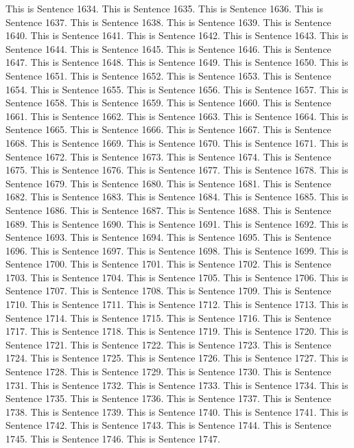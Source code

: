 \documentclass{article}
\begin{document}
This is Sentence 1634.
This is Sentence 1635.
This is Sentence 1636.
This is Sentence 1637.
This is Sentence 1638.
This is Sentence 1639.
This is Sentence 1640.
This is Sentence 1641.
This is Sentence 1642.
This is Sentence 1643.
This is Sentence 1644.
This is Sentence 1645.
This is Sentence 1646.
This is Sentence 1647.
This is Sentence 1648.
This is Sentence 1649.
This is Sentence 1650.
This is Sentence 1651.
This is Sentence 1652.
This is Sentence 1653.
This is Sentence 1654.
This is Sentence 1655.
This is Sentence 1656.
This is Sentence 1657.
This is Sentence 1658.
This is Sentence 1659.
This is Sentence 1660.
This is Sentence 1661.
This is Sentence 1662.
This is Sentence 1663.
This is Sentence 1664.
This is Sentence 1665.
This is Sentence 1666.
This is Sentence 1667.
This is Sentence 1668.
This is Sentence 1669.
This is Sentence 1670.
This is Sentence 1671.
This is Sentence 1672.
This is Sentence 1673.
This is Sentence 1674.
This is Sentence 1675.
This is Sentence 1676.
This is Sentence 1677.
This is Sentence 1678.
This is Sentence 1679.
This is Sentence 1680.
This is Sentence 1681.
This is Sentence 1682.
This is Sentence 1683.
This is Sentence 1684.
This is Sentence 1685.
This is Sentence 1686.
This is Sentence 1687.
This is Sentence 1688.
This is Sentence 1689.
This is Sentence 1690.
This is Sentence 1691.
This is Sentence 1692.
This is Sentence 1693.
This is Sentence 1694.
This is Sentence 1695.
This is Sentence 1696.
This is Sentence 1697.
This is Sentence 1698.
This is Sentence 1699.
This is Sentence 1700.
This is Sentence 1701.
This is Sentence 1702.
This is Sentence 1703.
This is Sentence 1704.
This is Sentence 1705.
This is Sentence 1706.
This is Sentence 1707.
This is Sentence 1708.
This is Sentence 1709.
This is Sentence 1710.
This is Sentence 1711.
This is Sentence 1712.
This is Sentence 1713.
This is Sentence 1714.
This is Sentence 1715.
This is Sentence 1716.
This is Sentence 1717.
This is Sentence 1718.
This is Sentence 1719.
This is Sentence 1720.
This is Sentence 1721.
This is Sentence 1722.
This is Sentence 1723.
This is Sentence 1724.
This is Sentence 1725.
This is Sentence 1726.
This is Sentence 1727.
This is Sentence 1728.
This is Sentence 1729.
This is Sentence 1730.
This is Sentence 1731.
This is Sentence 1732.
This is Sentence 1733.
This is Sentence 1734.
This is Sentence 1735.
This is Sentence 1736.
This is Sentence 1737.
This is Sentence 1738.
This is Sentence 1739.
This is Sentence 1740.
This is Sentence 1741.
This is Sentence 1742.
This is Sentence 1743.
This is Sentence 1744.
This is Sentence 1745.
This is Sentence 1746.
This is Sentence 1747.
\end{document}
